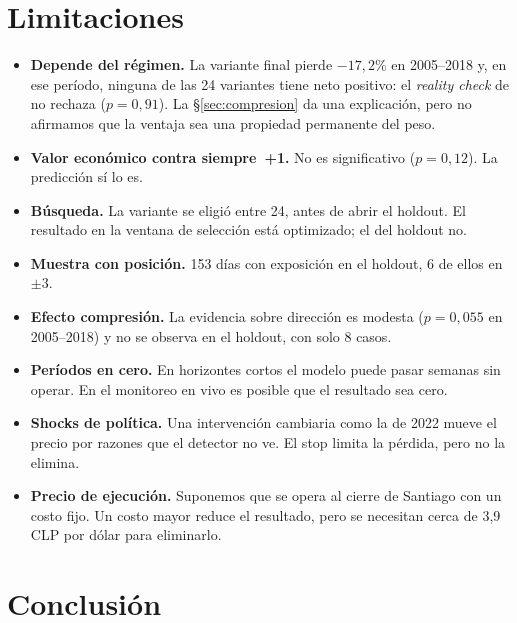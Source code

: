 \documentclass[10pt,a4paper]{article}
\begin{document}
\section{Limitaciones}\label{sec:limitaciones}

\begin{itemize}
  \item \textbf{Depende del régimen.} La variante final pierde $-17{,}2\%$ en
        2005--2018 y, en ese período, ninguna de las 24 variantes tiene neto
        positivo: el \emph{reality check} de \citet{white2000} no rechaza
        ($p=0{,}91$). La §\ref{sec:compresion} da una explicación, pero no
        afirmamos que la ventaja sea una propiedad permanente del peso.
  \item \textbf{Valor económico contra siempre~+1.} No es significativo
        ($p=0{,}12$). La predicción sí lo es.
  \item \textbf{Búsqueda.} La variante se eligió entre 24, antes de abrir el
        holdout. El resultado en la ventana de selección está optimizado; el del
        holdout no.
  \item \textbf{Muestra con posición.} 153 días con exposición en el holdout, 6
        de ellos en $\pm3$.
  \item \textbf{Efecto compresión.} La evidencia sobre dirección es modesta
        ($p=0{,}055$ en 2005--2018) y no se observa en el holdout, con solo 8
        casos.
  \item \textbf{Períodos en cero.} En horizontes cortos el modelo puede pasar
        semanas sin operar. En el monitoreo en vivo es posible que el resultado
        sea cero.
  \item \textbf{Shocks de política.} Una intervención cambiaria como la de 2022
        mueve el precio por razones que el detector no ve. El stop limita la
        pérdida, pero no la elimina.
  \item \textbf{Precio de ejecución.} Suponemos que se opera al cierre de
        Santiago con un costo fijo. Un costo mayor reduce el resultado, pero se
        necesitan cerca de 3,9 CLP por dólar para eliminarlo.
\end{itemize}

\section{Conclusión}
\end{document}
